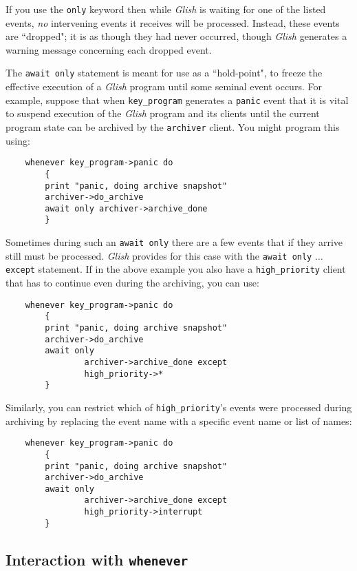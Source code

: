If you use the {\tt only} keyword then while {\em Glish} is waiting for
one of the listed events, {\em no} intervening events it receives
will be processed.  Instead, these events are ``dropped"; it
is as though they had never occurred, though {\em Glish} generates a
warning message concerning each dropped event.

The {\tt await only} statement is meant for use as 
a ``hold-point", to freeze
the effective execution of a {\em Glish} program until some seminal event
occurs.  For example, suppose that when {\tt key\_program} generates
a {\tt panic} event that it is vital to suspend execution of the
{\em Glish} program and its clients until the current program state can
be archived by the {\tt archiver} client.  You might program this
using:
\begin{verbatim}
    whenever key_program->panic do
        {
        print "panic, doing archive snapshot"
        archiver->do_archive
        await only archiver->archive_done
        }
\end{verbatim}

Sometimes during such an {\tt await only} there are a few events
that if they arrive still must be processed.  {\em Glish} provides for
this case with the {\tt await only} $\ldots$ {\tt except} statement.
If in the above example you also have a {\tt high\_priority} client
that has to continue even during the archiving, you can  use:
\begin{verbatim}
    whenever key_program->panic do
        {
        print "panic, doing archive snapshot"
        archiver->do_archive
        await only
                archiver->archive_done except
                high_priority->*
        }
\end{verbatim}
Similarly, you can restrict which of {\tt high\_priority}'s events
were processed during archiving by replacing the {\tt *} event name
with a specific event name or list of names:
\begin{verbatim}
    whenever key_program->panic do
        {
        print "panic, doing archive snapshot"
        archiver->do_archive
        await only
                archiver->archive_done except
                high_priority->interrupt
        }
\end{verbatim}

\subsection{Interaction with {\tt whenever}}
\label{await-and-whenever}

